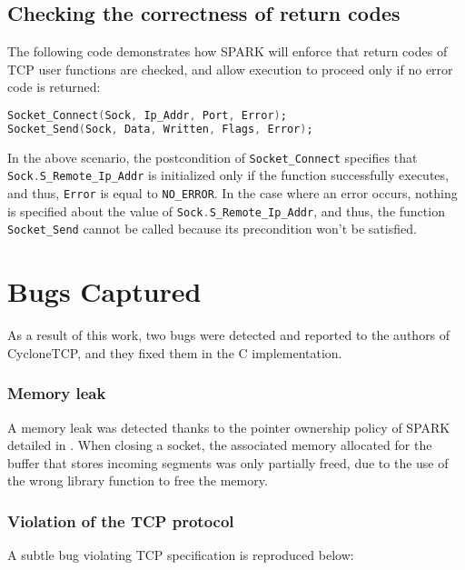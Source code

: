 \documentclass[conference]{IEEEtran}
\def\spark#1{\lstinline[language=Ada]{#1}}
\begin{document}
\subsection{Checking the correctness of return codes}

The following code demonstrates how SPARK will enforce that return codes of TCP user functions are checked, and allow execution to proceed only if no error code is returned:

\begin{lstlisting}[language=Ada,basicstyle=\small\ttfamily]
Socket_Connect(Sock, Ip_Addr, Port, Error);
Socket_Send(Sock, Data, Written, Flags, Error);
\end{lstlisting}

In the above scenario, the postcondition of \spark{Socket_Connect} specifies that \spark{Sock.S_Remote_Ip_Addr} is initialized only if the function successfully executes, and thus, \spark{Error} is equal to \spark{NO_ERROR}. In the case where an error occurs, nothing is specified about the value of \spark{Sock.S_Remote_Ip_Addr}, and thus, the function \spark{Socket_Send} cannot be called because its precondition won't be satisfied.

\section{Bugs Captured}
\label{sec:results}

As a result of this work, two bugs were detected and reported to the authors of
CycloneTCP, and they fixed them in the C implementation.

\subsubsection{Memory leak}

A memory leak was detected thanks to the pointer ownership policy of SPARK
detailed in . When closing a socket, the associated memory
allocated for the buffer that stores incoming segments was only partially
freed, due to the use of the wrong library function to free the memory.

\subsubsection{Violation of the TCP protocol}

A subtle bug violating TCP specification is reproduced below:
\end{document}
